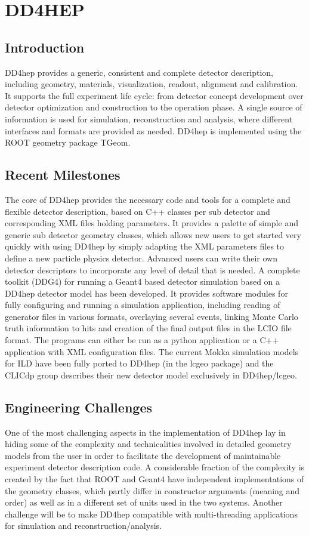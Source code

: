 \section{DD4HEP}

\subsection{Introduction}
DD4hep\cite{dd4hepWebsite,1742-6596-513-2-022010} provides a generic, consistent and complete detector description, including geometry, materials, visualization, readout, alignment and calibration. It supports the full experiment life cycle: from detector concept development over detector optimization and construction to the operation phase. A single source of information is used for simulation, reconstruction and analysis, where different interfaces and formats are provided as needed. DD4hep is implemented using the ROOT geometry package TGeom.

\subsection{Recent Milestones}
The core of DD4hep provides the necessary code and tools for a complete and flexible detector description, based on C++ classes per sub detector and corresponding XML files holding parameters. It provides a palette of simple and generic sub detector geometry classes, which allows new users to get started very quickly with using DD4hep by simply adapting the XML parameters files to define a new particle physics detector. Advanced users can write their own detector descriptors to incorporate any level of detail that is needed. A complete toolkit (DDG4)\cite{DDG4:CHEP2015} for running a Geant4 based detector simulation based on a DD4hep detector model has been developed. It provides software modules for fully configuring and running a simulation application, including reading of generator files in various formats, overlaying several events, linking Monte Carlo truth information to hits and creation of the final output files in the LCIO file format. The programs can either be run as a python application or a C++ application with XML configuration files. The current Mokka simulation models for ILD have been fully ported to DD4hep (in the lcgeo package) and the CLICdp group describes their new detector model exclusively in DD4hep/lcgeo.

\subsection{Engineering Challenges}
One of the most challenging aspects in the implementation of DD4hep lay in hiding some of the complexity and technicalities involved in detailed geometry models from the user in order to facilitate the development of maintainable experiment detector description code. A considerable fraction of the complexity is created by the fact that ROOT and Geant4 have independent implementations of the geometry classes, which partly differ in constructor arguments (meaning and order) as well as in a different set of units used in the two systems. Another challenge will be to make DD4hep compatible with multi-threading applications for simulation and reconstruction/analysis.

